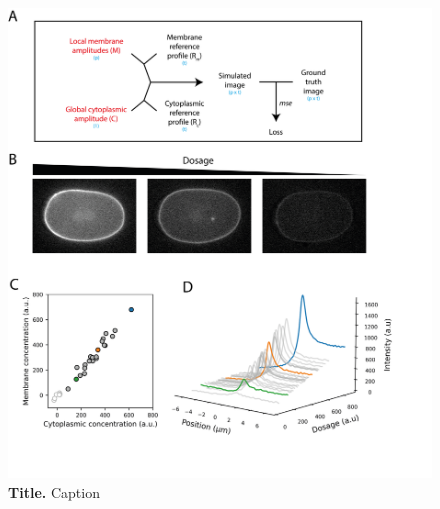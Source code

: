 \documentclass[11pt]{"article"}
\newcommand{\mycaption}[2]{\caption[#1]{\textbf{#1.} #2}}
\begin{document}
\begin{figure}[!h]
\includegraphics[scale=1]{memquant_benchmarking_ph_rundown}
\setlength{\abovecaptionskip}{20pt}
\centering
\mycaption{Title}{Caption}
\end{figure}
\end{document}
